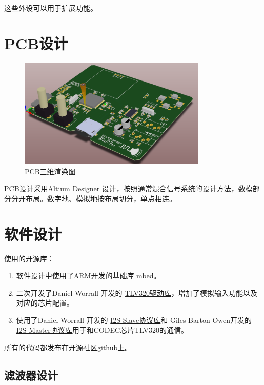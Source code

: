 \documentclass[16pt,a4paper]{article}
\begin{document}
这些外设可以用于扩展功能。

\section{PCB设计}
\begin{figure}[H]
\centering
\includegraphics[width=0.8\textwidth]{pcb3D.png}
\caption{PCB三维渲染图} 
\end{figure}
PCB设计采用Altium Designer 设计，按照通常混合信号系统的设计方法，数模部分分开布局。数字地、模拟地按布局切分，单点相连。


\section{软件设计}
使用的开源库：
\begin{enumerate}
\item 软件设计中使用了ARM开发的基础库 \href{https://developer.mbed.org/users/mbed_official/code/mbed/}{mbed}。
\item 二次开发了Daniel Worrall 开发的 \href{https://developer.mbed.org/cookbook/TLV320AIC23B}{TLV320驱动库}，增加了模拟输入功能以及对应的芯片配置。
\item 使用了Daniel Worrall 开发的 \href{https://developer.mbed.org/users/d_worrall/code/I2SSlave/}{I2S Slave协议库}和 Giles Barton-Owen开发的 \href{https://developer.mbed.org/users/p07gbar/code/I2S/}{I2S Master协议库}用于和CODEC芯片TLV320的通信。
\end{enumerate}


所有的代码都发布在\href{https://github.com/gjc13/Stethoscope}{开源社区github}上。

\subsection{滤波器设计}
\end{document}
